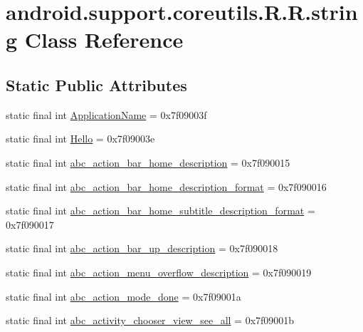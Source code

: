 \hypertarget{classandroid_1_1support_1_1coreutils_1_1_r_1_1string}{
\section{android.support.coreutils.R.R.string Class Reference}
\label{classandroid_1_1support_1_1coreutils_1_1_r_1_1string}
}
\subsection*{Static Public Attributes}
\begin{CompactItemize}
\item 
static final int \hyperlink{classandroid_1_1support_1_1coreutils_1_1_r_1_1string_0ad893eb08a0a7f77623bac3003c080a}{ApplicationName} = 0x7f09003f
\item 
static final int \hyperlink{classandroid_1_1support_1_1coreutils_1_1_r_1_1string_f32649b7f5f79162b9b060875a110c77}{Hello} = 0x7f09003e
\item 
static final int \hyperlink{classandroid_1_1support_1_1coreutils_1_1_r_1_1string_2f52bdadca8a15d75186a9d762f35e2c}{abc\_\-action\_\-bar\_\-home\_\-description} = 0x7f090015
\item 
static final int \hyperlink{classandroid_1_1support_1_1coreutils_1_1_r_1_1string_562d3a193c739238e57d81781cc9303b}{abc\_\-action\_\-bar\_\-home\_\-description\_\-format} = 0x7f090016
\item 
static final int \hyperlink{classandroid_1_1support_1_1coreutils_1_1_r_1_1string_2d250826000c564b5397983e34e6e94d}{abc\_\-action\_\-bar\_\-home\_\-subtitle\_\-description\_\-format} = 0x7f090017
\item 
static final int \hyperlink{classandroid_1_1support_1_1coreutils_1_1_r_1_1string_26c657f69fc2574b46670a75af2dcdce}{abc\_\-action\_\-bar\_\-up\_\-description} = 0x7f090018
\item 
static final int \hyperlink{classandroid_1_1support_1_1coreutils_1_1_r_1_1string_b1298c27cd35e2d22ce28ebaffb9323f}{abc\_\-action\_\-menu\_\-overflow\_\-description} = 0x7f090019
\item 
static final int \hyperlink{classandroid_1_1support_1_1coreutils_1_1_r_1_1string_9048881a0de8140c5a88095307077b02}{abc\_\-action\_\-mode\_\-done} = 0x7f09001a
\item 
static final int \hyperlink{classandroid_1_1support_1_1coreutils_1_1_r_1_1string_e01fbc3f62762a88c0d9037e4d2c6e73}{abc\_\-activity\_\-chooser\_\-view\_\-see\_\-all} = 0x7f09001b

\end{CompactItemize}
